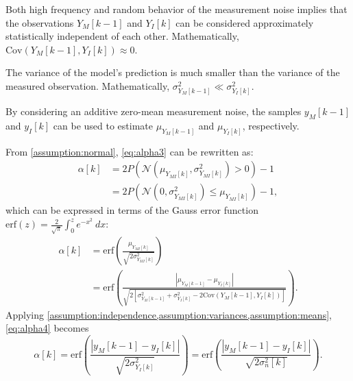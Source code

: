 \begin{assumption}
    Both high frequency and random behavior of the measurement noise implies that 
    the observations $Y_M[k - 1]$ and $Y_I[k]$ can be considered approximately statistically independent of each other. 
    Mathematically, $\mathrm{Cov} (Y_M[k-1], Y_I[k]) \approx 0$.
\label{assumption:independence}
\end{assumption}

\begin{assumption}
    The variance of the model's prediction is much smaller than the variance of the measured observation.
    Mathematically, $\sigma^2_{Y_M[k-1]} \ll \sigma^2_{Y_I[k]}$.
\label{assumption:variances}
\end{assumption}

\begin{assumption}
    By considering an additive zero-mean measurement noise, the samples $y_M[k-1]$ and $y_I[k]$ 
    can be used to estimate $\mu_{Y_M[k-1]}$ and $\mu_{Y_I[k]}$, respectively.
\label{assumption:means}
\end{assumption}

From \cref{assumption:normal}, \cref{eq:alpha3} can be rewritten as:
%
\begin{align}
    \alpha[k] 
    &= 2 P(\mathcal{N}(\mu_{Y_{MI}[k]}, \sigma^2_{Y_{MI}[k]}) > 0) - 1 \nonumber\\
    &= 2 P(\mathcal{N}(0, \sigma^2_{Y_{MI}[k]}) \leq \mu_{Y_{MI}[k]}) - 1,
\end{align}
%
which can be expressed in terms of the Gauss error function
$\mathrm{erf}(z) = \frac{2}{\sqrt{\pi}} \int_0^z e^{-x^2} \ dx$:
%
\begin{align}
    \alpha[k] 
    &= \mathrm{erf}\left(\frac{\mu_{Y_{MI}[k]}}{\sqrt{2 \sigma^2_{Y_{MI}[k]}}}\right) \nonumber \\
    &= \mathrm{erf}\left(
        \frac{|\mu_{Y_M[k-1]} - \mu_{Y_I[k]}|}
             {\sqrt{2[\sigma^2_{Y_M[k-1]} + \sigma^2_{Y_I[k]} - 2 \mathrm{Cov}(Y_M[k-1], Y_I[k])]}}
        \right).
\label{eq:alpha4}
\end{align}
%
Applying \cref{assumption:independence,assumption:variances,assumption:means}, 
\cref{eq:alpha4} becomes
%
\begin{equation}
    \alpha[k] 
    = \mathrm{erf}\left(
        \frac{|y_M[k-1] - y_I[k]|}
             {\sqrt{2\sigma^2_{Y_I[k]}}}
        \right)
    = \mathrm{erf}\left(
        \frac{|y_M[k-1] - y_I[k]|}
             {\sqrt{2\sigma^2_n[k]}}
        \right).
\end{equation}

